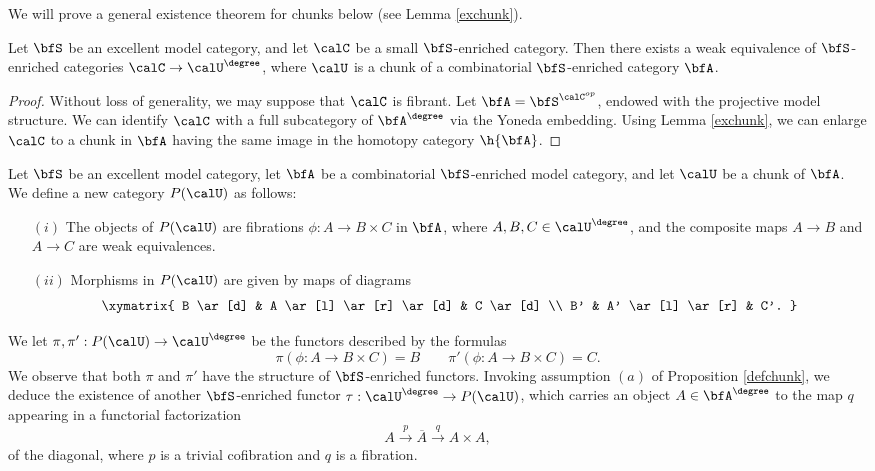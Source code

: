 \begin{Simplicial Categories}
We will prove a general existence theorem for chunks below (see Lemma \ref{exchunk}).

\begin{lemma}\label{tubble}
Let $\bfS$ be an excellent model category, and let $\calC$ be a small $\bfS$-enriched
category. Then there exists a weak equivalence of $\bfS$-enriched categories
$\calC \rightarrow \calU^{\degree}$, where $\calU$ is a chunk of a combinatorial
$\bfS$-enriched category $\bfA$.
\end{lemma}

\begin{proof}
Without loss of generality, we may suppose that $\calC$ is fibrant. Let
$\bfA = \bfS^{ \calC^{op}}$, endowed with the projective model structure.
We can identify $\calC$ with a full subcategory of $\bfA^{\degree}$ via the Yoneda embedding.
Using Lemma \ref{exchunk}, we can enlarge $\calC$ to a chunk in $\bfA$ having the same
image in the homotopy category $\h{\bfA}$.
\end{proof}

\begin{notation}
Let $\bfS$ be an excellent model category, let $\bfA$ be a combinatorial
$\bfS$-enriched model category, and let $\calU$ be a chunk of $\bfA$. We
define a new category
$P(\calU)$ as follows:
\begin{itemize}
\item[$(i)$] The objects of $P(\calU)$ are fibrations
$\phi: A \rightarrow B \times C$ in $\bfA$, where 
$A, B, C \in \calU^{\degree}$, and the composite maps
$A \rightarrow B$ and $A \rightarrow C$ are weak equivalences.
\item[$(ii)$] Morphisms in $P(\calU)$ are given by
maps of diagrams
$$ \xymatrix{ B \ar[d] & A \ar[l] \ar[r] \ar[d] & C \ar[d] \\
B' & A' \ar[l] \ar[r] & C'. }$$
\end{itemize}

We let $\pi, \pi': P(\calU) \rightarrow \calU^{\degree}$ be the functors described by the formulas
$$ \pi( \phi: A \rightarrow B \times C) = B \quad \quad \pi'( \phi: A \rightarrow B \times C) = C.$$
We observe that both $\pi$ and $\pi'$ have the structure of $\bfS$-enriched functors.
Invoking assumption $(a)$ of Proposition \ref{defchunk}, we deduce the
existence of another $\bfS$-enriched functor $\tau: \calU^{\degree} \rightarrow P(\calU)$, which
carries an object $A \in \bfA^{\degree}$ to the map $q$ appearing in a functorial
factorization
$$ A \stackrel{p}{\rightarrow} \overline{A} \stackrel{q}{\rightarrow} A \times A,$$
of the diagonal, where $p$ is a trivial cofibration and $q$ is a fibration.
\end{notation}


\end{Simplicial Categories}
